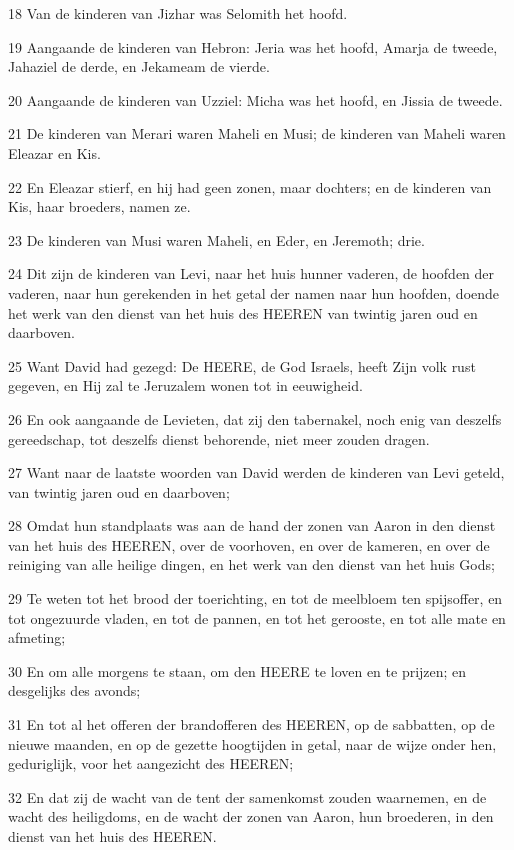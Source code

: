 \par 18 Van de kinderen van Jizhar was Selomith het hoofd.
\par 19 Aangaande de kinderen van Hebron: Jeria was het hoofd, Amarja de tweede, Jahaziel de derde, en Jekameam de vierde.
\par 20 Aangaande de kinderen van Uzziel: Micha was het hoofd, en Jissia de tweede.
\par 21 De kinderen van Merari waren Maheli en Musi; de kinderen van Maheli waren Eleazar en Kis.
\par 22 En Eleazar stierf, en hij had geen zonen, maar dochters; en de kinderen van Kis, haar broeders, namen ze.
\par 23 De kinderen van Musi waren Maheli, en Eder, en Jeremoth; drie.
\par 24 Dit zijn de kinderen van Levi, naar het huis hunner vaderen, de hoofden der vaderen, naar hun gerekenden in het getal der namen naar hun hoofden, doende het werk van den dienst van het huis des HEEREN van twintig jaren oud en daarboven.
\par 25 Want David had gezegd: De HEERE, de God Israels, heeft Zijn volk rust gegeven, en Hij zal te Jeruzalem wonen tot in eeuwigheid.
\par 26 En ook aangaande de Levieten, dat zij den tabernakel, noch enig van deszelfs gereedschap, tot deszelfs dienst behorende, niet meer zouden dragen.
\par 27 Want naar de laatste woorden van David werden de kinderen van Levi geteld, van twintig jaren oud en daarboven;
\par 28 Omdat hun standplaats was aan de hand der zonen van Aaron in den dienst van het huis des HEEREN, over de voorhoven, en over de kameren, en over de reiniging van alle heilige dingen, en het werk van den dienst van het huis Gods;
\par 29 Te weten tot het brood der toerichting, en tot de meelbloem ten spijsoffer, en tot ongezuurde vladen, en tot de pannen, en tot het gerooste, en tot alle mate en afmeting;
\par 30 En om alle morgens te staan, om den HEERE te loven en te prijzen; en desgelijks des avonds;
\par 31 En tot al het offeren der brandofferen des HEEREN, op de sabbatten, op de nieuwe maanden, en op de gezette hoogtijden in getal, naar de wijze onder hen, geduriglijk, voor het aangezicht des HEEREN;
\par 32 En dat zij de wacht van de tent der samenkomst zouden waarnemen, en de wacht des heiligdoms, en de wacht der zonen van Aaron, hun broederen, in den dienst van het huis des HEEREN.

